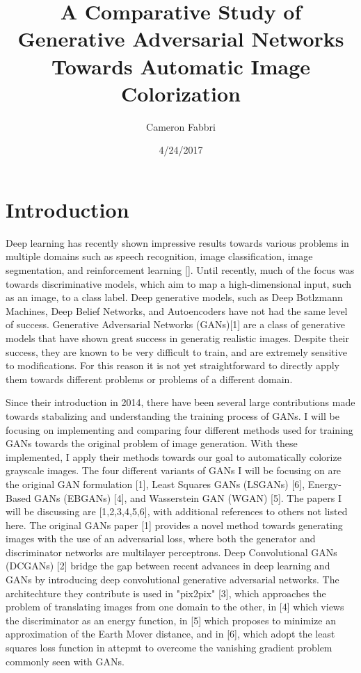 \documentclass{article}
\begin{document}
\title{A Comparative Study of Generative Adversarial Networks Towards Automatic Image Colorization}

\author{Cameron Fabbri}
\date{4/24/2017}

\maketitle

\section{Introduction}
Deep learning has recently shown impressive results towards various problems in multiple domains such as speech recognition,
image classification, image segmentation, and reinforcement learning []. Until recently, much of the focus was towards
discriminative models, which aim to map a high-dimensional input, such as an image, to a class label. Deep generative models,
such as Deep Botlzmann Machines, Deep Belief Networks, and Autoencoders have not had the same level of success.
Generative Adversarial Networks (GANs)[1] are a class of generative models that have shown great success in generatig realistic
images. Despite their success, they are known to be very difficult to train, and are extremely sensitive to modifications.
For this reason it is not yet straightforward to directly apply them towards different problems or problems of a different domain.\newline

\noindent Since their introduction in 2014, there have been several large contributions made towards stabalizing and understanding
the training process of GANs. I will be focusing on implementing and comparing four different methods used for training GANs towards
the original problem of image generation. With these implemented, I apply their methods towards our goal to automatically
colorize grayscale images. The four different variants of GANs I will be focusing on are the original GAN formulation [1], Least Squares
GANs (LSGANs) [6], Energy-Based GANs (EBGANs) [4], and Wasserstein GAN (WGAN) [5]. The papers I will be discussing are [1,2,3,4,5,6], with additional
references to others not listed here. The original GANs paper [1] provides a novel method towards generating images with the use of an
adversarial loss, where both the generator and discriminator networks are multilayer perceptrons. Deep Convolutional GANs (DCGANs) [2]
bridge the gap between recent advances in deep learning and GANs by introducing deep convolutional generative adversarial networks. The architechture they contribute
is used in "pix2pix" [3], which approaches the problem of translating images from one domain to the other, in [4] which views the discriminator
as an energy function, in [5] which proposes to minimize an approximation of the Earth Mover distance, and in [6], which adopt the
least squares loss function in attepmt to overcome the vanishing gradient problem commonly seen with GANs.
\end{document}
